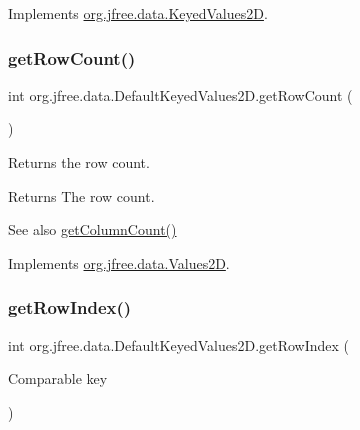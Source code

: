 Implements \mbox{\hyperlink{interfaceorg_1_1jfree_1_1data_1_1_keyed_values2_d_af6b8780fee7cccdb967fc0f199398615}{org.\+jfree.\+data.\+Keyed\+Values2D}}.

\mbox{\label{classorg_1_1jfree_1_1data_1_1_default_keyed_values2_d_aaa4f83398caf1c5a2e59e719d72de13f}} 
\subsubsection{\texorpdfstring{get\+Row\+Count()}{getRowCount()}}
{\footnotesize\ttfamily int org.\+jfree.\+data.\+Default\+Keyed\+Values2\+D.\+get\+Row\+Count (\begin{DoxyParamCaption}{ }\end{DoxyParamCaption})}

Returns the row count.

\begin{DoxyReturn}{Returns}
The row count.
\end{DoxyReturn}
\begin{DoxySeeAlso}{See also}
\mbox{\hyperlink{classorg_1_1jfree_1_1data_1_1_default_keyed_values2_d_add387af47bf3263842b9c06ef212bad2}{get\+Column\+Count()}} 
\end{DoxySeeAlso}


Implements \mbox{\hyperlink{interfaceorg_1_1jfree_1_1data_1_1_values2_d_a9ce939b45128515a9841a7d018a6ad0e}{org.\+jfree.\+data.\+Values2D}}.

\mbox{\label{classorg_1_1jfree_1_1data_1_1_default_keyed_values2_d_aaca2e39352630d0f49c45a09b8a106e6}} 
\subsubsection{\texorpdfstring{get\+Row\+Index()}{getRowIndex()}}
{\footnotesize\ttfamily int org.\+jfree.\+data.\+Default\+Keyed\+Values2\+D.\+get\+Row\+Index (\begin{DoxyParamCaption}\item[{Comparable}]{key }\end{DoxyParamCaption})}

